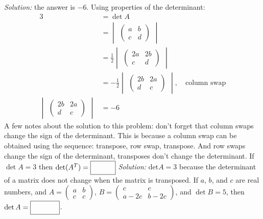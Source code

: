\begin{parts}
        \ifnum {} {\color{DarkBlue} \textit{Solution:} the answer is $-6$. Using properties of the determinant:
        \begin{align}
            3 & = \det A \\
            &= \begin{vmatrix}\begin{pmatrix} a&b\\c&d \end{pmatrix}\end{vmatrix} \\
            &= \frac12 \begin{vmatrix}\begin{pmatrix} 2a&2b\\c&d \end{pmatrix}\end{vmatrix} \\
            &= -\frac12 \begin{vmatrix}\begin{pmatrix} 2b&2a\\d&c \end{pmatrix}\end{vmatrix}, \quad \text{column swap} \\
            \begin{vmatrix}\begin{pmatrix} 2b&2a\\d&c \end{pmatrix}\end{vmatrix} & = -6
        \end{align} 
         A few notes about the solution to this problem: don't forget that column swaps change the sign of the determinant. This is because a column swap can be obtained using the sequence: transpose, row swap, transpose. And row swaps change the sign of the determinant, transposes don't change the determinant. 
        }
        \fi    
    \fi 
    \ifnum {}
        If $\det A = 3$ then $\det (A^T) = \framebox{\strut\hspace{1cm}}$
        \ifnum {} {\color{DarkBlue} \textit{Solution:} $\text{det}A = 3$ because the determinant of a matrix does not change when the matrix is transposed. } \fi    
    \fi 
    \ifnum {}
        If $a$, $b$, and $c$ are real numbers, and $A = \begin{pmatrix} a&b\\c&c\end{pmatrix}$, $ B = \begin{pmatrix}c&c\\a-2c&b-2c \end{pmatrix}$, and $ \det B = 5$, then $\det A =  \framebox{\strut\hspace{1.2cm}}$.

\end{parts}
